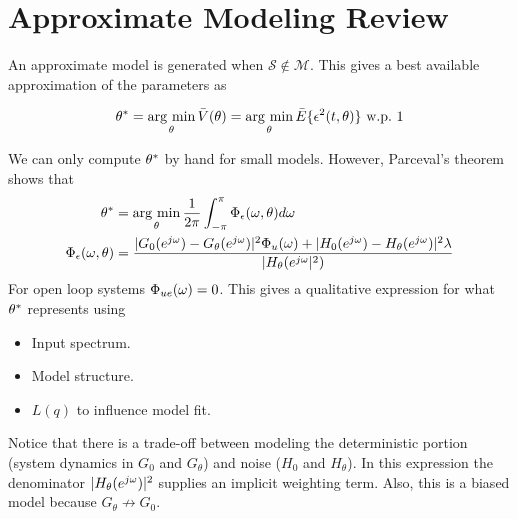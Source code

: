 \mainmatter%
\setcounter{page}{1}

\lectureseries[\course]{\course}

\date{November 24, 2009}

\setaddress%

\setcounter{lecture}{16}
\setcounter{chapter}{16}


\section{Approximate Modeling Review}
An approximate model is generated when $\mathcal{S}\notin\mathcal{M}$.
This gives a best available approximation of the parameters as

\begin{equation*}
\theta^\ast = \mathop{\arg\,\min}\limits_\theta \bar{V}(\theta) = \mathop{\arg\,\min}\limits_\theta\bar{E}\{\epsilon^2(t,\theta)\} \text{~w.p.~} 1
\end{equation*}

We can only compute $\theta^\ast$ by hand for small models.
However, Parceval's theorem shows that
\begin{align*}
\theta^\ast &= \mathop{\arg\,\min}\limits_\theta \frac{1}{2\pi}\int_{-\pi}^\pi \Phi_\epsilon(\omega,\theta)d\omega \\
\Phi_\epsilon(\omega,\theta) &= \frac{|G_0(e^{j\omega})-G_\theta(e^{j\omega})|^2\Phi_u(\omega) + |H_0(e^{j\omega})-H_\theta(e^{j\omega})|^2\lambda}{|H_\theta(e^{j\omega}|^2)}
\end{align*}
For open loop systems $\Phi_{ue}(\omega) = 0$.
This gives a qualitative expression for what $\theta^\ast$ represents using
\begin{itemize}
\item Input spectrum.
\item Model structure.
\item $L(q)$ to influence model fit.
\end{itemize}
Notice that there is a trade-off between modeling the deterministic portion (system dynamics in $G_0$ and $G_\theta$) and noise ($H_0$ and $H_\theta$).
In this expression the denominator $|H_\theta(e^{j\omega})|^2$ supplies an implicit weighting term.
Also, this is a biased model because $G_\theta\not\to G_0$.


